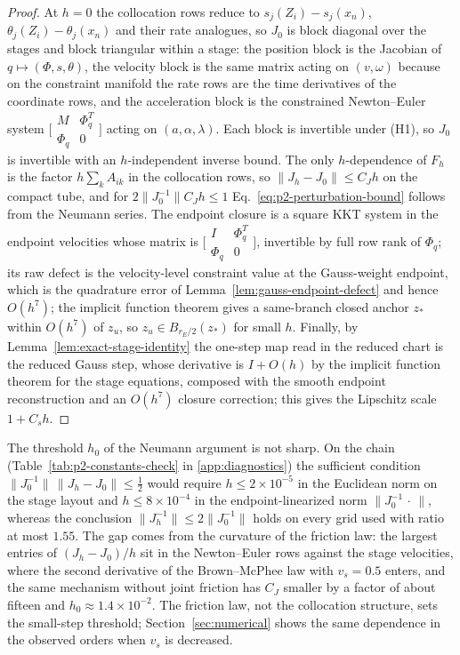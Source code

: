 \begin{proof}
At $h=0$ the collocation rows reduce to $s_j(Z_i)-s_j(x_n)$, $\theta_j(Z_i)-\theta_j(x_n)$ and
their rate analogues, so $J_0$ is block diagonal over the stages and block triangular within a
stage: the position block is the Jacobian of $q\mapsto(\Phi,s,\theta)$, the velocity block is the
same matrix acting on $(v,\omega)$ because on the constraint manifold the rate rows are the time
derivatives of the coordinate rows, and the acceleration block is the constrained Newton--Euler
system $\bigl[\begin{smallmatrix}M&\Phi_q^T\\ \Phi_q&0\end{smallmatrix}\bigr]$ acting on
$(a,\alpha,\lambda)$. Each block is invertible under (H1), so $J_0$ is invertible with an
$h$-independent inverse bound. The only $h$-dependence of $F_h$ is the factor $h\sum_kA_{ik}$ in
the collocation rows, so $\|J_h-J_0\|\le C_Jh$ on the compact tube, and for
$2\|J_0^{-1}\|C_Jh\le1$ Eq.~\eqref{eq:p2-perturbation-bound} follows from the Neumann series. The
endpoint closure is a square KKT system in the endpoint velocities whose matrix is
$\bigl[\begin{smallmatrix}I&\Phi_q^T\\ \Phi_q&0\end{smallmatrix}\bigr]$, invertible by full row rank
of $\Phi_q$; its raw defect is the velocity-level constraint value at the Gauss-weight endpoint,
which is the quadrature error of Lemma~\ref{lem:gauss-endpoint-defect} and hence $O(h^7)$; the
implicit function theorem gives a same-branch closed anchor $z_\ast$ within $O(h^7)$ of $z_u$, so
$z_u\in B_{r_E/2}(z_\ast)$ for small $h$. Finally, by Lemma~\ref{lem:exact-stage-identity} the
one-step map read in the reduced chart is the reduced Gauss step, whose derivative is $I+O(h)$ by
the implicit function theorem for the stage equations, composed with the smooth endpoint
reconstruction and an $O(h^7)$ closure correction; this gives the Lipschitz scale $1+C_sh$.
\end{proof}

The threshold $h_0$ of the Neumann argument is not sharp. On the chain
(Table~\ref{tab:p2-constants-check} in \ref{app:diagnostics}) the sufficient condition
$\|J_0^{-1}\|\,\|J_h-J_0\|\le\tfrac12$ would require $h\le2\times10^{-5}$ in the Euclidean norm on
the stage layout and $h\le8\times10^{-4}$ in the endpoint-linearized norm $\|J_0^{-1}\,\cdot\,\|$,
whereas the conclusion $\|J_h^{-1}\|\le2\|J_0^{-1}\|$ holds on every grid used with ratio at most
$1.55$. The gap comes from the curvature of the friction law: the largest entries of $(J_h-J_0)/h$
sit in the Newton--Euler rows against the stage velocities, where the second derivative of the
Brown--McPhee law with $v_s=0.5$ enters, and the same mechanism without joint friction has $C_J$
smaller by a factor of about fifteen and $h_0\approx1.4\times10^{-2}$. The friction law, not the
collocation structure, sets the small-step threshold; Section~\ref{sec:numerical} shows the same
dependence in the observed orders when $v_s$ is decreased.

